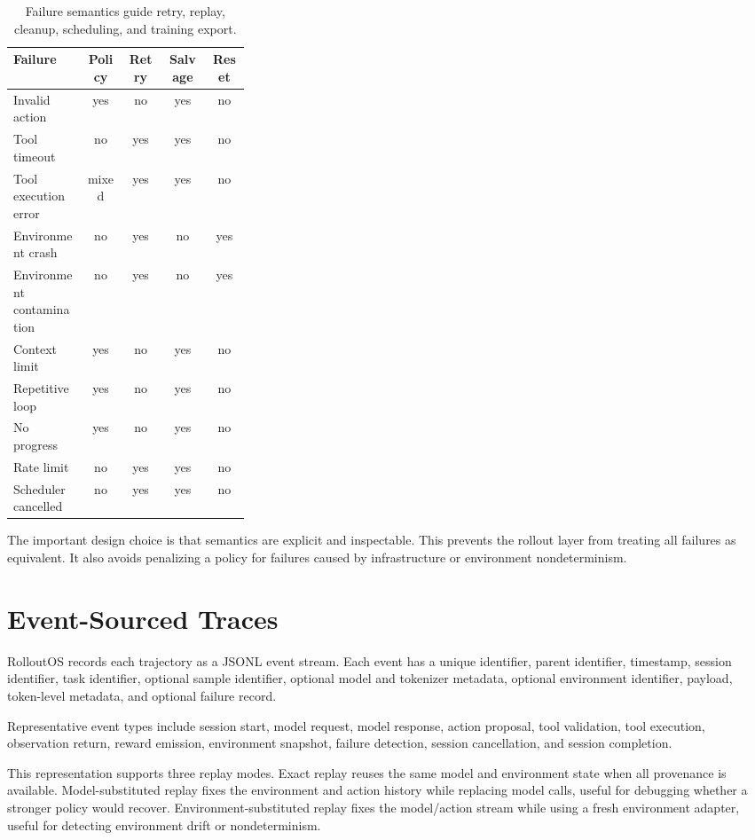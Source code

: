 \documentclass{article}
\newcommand{\sys}{RolloutOS}
\begin{document}
\begin{table}[t]
\centering
\scriptsize
\begin{tabular}{p{0.31\linewidth}cccc}
\toprule
\textbf{Failure} & \textbf{Policy} & \textbf{Retry} & \textbf{Salvage} & \textbf{Reset}\\
\midrule
Invalid action & yes & no & yes & no\\
Tool timeout & no & yes & yes & no\\
Tool execution error & mixed & yes & yes & no\\
Environment crash & no & yes & no & yes\\
Environment contamination & no & yes & no & yes\\
Context limit & yes & no & yes & no\\
Repetitive loop & yes & no & yes & no\\
No progress & yes & no & yes & no\\
Rate limit & no & yes & yes & no\\
Scheduler cancelled & no & yes & yes & no\\
\bottomrule
\end{tabular}
\caption{Failure semantics guide retry, replay, cleanup, scheduling, and training export.}
\label{tab:failures}
\end{table}

The important design choice is that semantics are explicit and inspectable.
This prevents the rollout layer from treating all failures as equivalent.
It also avoids penalizing a policy for failures caused by infrastructure or environment nondeterminism.

\section{Event-Sourced Traces}

\sys{} records each trajectory as a JSONL event stream.
Each event has a unique identifier, parent identifier, timestamp, session identifier, task identifier, optional sample identifier, optional model and tokenizer metadata, optional environment identifier, payload, token-level metadata, and optional failure record.

Representative event types include session start, model request, model response, action proposal, tool validation, tool execution, observation return, reward emission, environment snapshot, failure detection, session cancellation, and session completion.

This representation supports three replay modes.
Exact replay reuses the same model and environment state when all provenance is available.
Model-substituted replay fixes the environment and action history while replacing model calls, useful for debugging whether a stronger policy would recover.
Environment-substituted replay fixes the model/action stream while using a fresh environment adapter, useful for detecting environment drift or nondeterminism.
\end{document}
